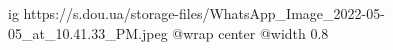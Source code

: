  
 
 
 
 

\ifcmt
  ig https://s.dou.ua/storage-files/WhatsApp_Image_2022-05-05_at_10.41.33_PM.jpeg
  @wrap center
  @width 0.8
\fi
